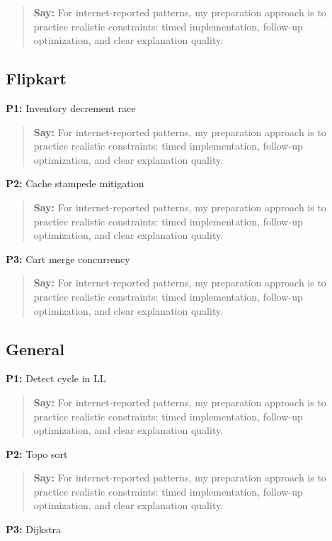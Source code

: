\documentclass[9pt,a4paper]{article}
\begin{document}
\begin{quote}\small\textbf{Say:} For internet-reported patterns, my preparation approach is to practice realistic constraints: timed implementation, follow-up optimization, and clear explanation quality.\end{quote}
\vspace{2mm}
\subsection{Flipkart}
\textbf{P1:} Inventory decrement race

\begin{quote}\small\textbf{Say:} For internet-reported patterns, my preparation approach is to practice realistic constraints: timed implementation, follow-up optimization, and clear explanation quality.\end{quote}
\vspace{2mm}
\textbf{P2:} Cache stampede mitigation

\begin{quote}\small\textbf{Say:} For internet-reported patterns, my preparation approach is to practice realistic constraints: timed implementation, follow-up optimization, and clear explanation quality.\end{quote}
\vspace{2mm}
\textbf{P3:} Cart merge concurrency

\begin{quote}\small\textbf{Say:} For internet-reported patterns, my preparation approach is to practice realistic constraints: timed implementation, follow-up optimization, and clear explanation quality.\end{quote}
\vspace{2mm}
\subsection{General}
\textbf{P1:} Detect cycle in LL

\begin{quote}\small\textbf{Say:} For internet-reported patterns, my preparation approach is to practice realistic constraints: timed implementation, follow-up optimization, and clear explanation quality.\end{quote}
\vspace{2mm}
\textbf{P2:} Topo sort

\begin{quote}\small\textbf{Say:} For internet-reported patterns, my preparation approach is to practice realistic constraints: timed implementation, follow-up optimization, and clear explanation quality.\end{quote}
\vspace{2mm}
\textbf{P3:} Dijkstra
\end{document}
